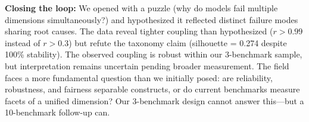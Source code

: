 \textbf{Closing the loop:} We opened with a puzzle (why do models fail multiple dimensions simultaneously?) and hypothesized it reflected distinct failure modes sharing root causes. The data reveal tighter coupling than hypothesized ($r > 0.99$ instead of $r > 0.3$) but refute the taxonomy claim (silhouette = 0.274 despite 100\% stability). The observed coupling is robust within our 3-benchmark sample, but interpretation remains uncertain pending broader measurement. The field faces a more fundamental question than we initially posed: are reliability, robustness, and fairness separable constructs, or do current benchmarks measure facets of a unified dimension? Our 3-benchmark design cannot answer this---but a 10-benchmark follow-up can.
